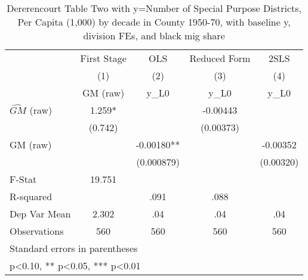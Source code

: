 \begin{table}[htbp]\centering
\def\sym#1{\ifmmode^{#1}\else\(^{#1}\)\fi}
\caption{Dererencourt Table Two with y=Number of Special Purpose Districts, Per Capita (1,000) by decade in County 1950-70, with baseline y, division FEs, and black mig share}
\begin{tabular}{l*{4}{c}}
\toprule
                    & First Stage   &         OLS   &Reduced Form   &        2SLS   \\
                    &\multicolumn{1}{c}{(1)}&\multicolumn{1}{c}{(2)}&\multicolumn{1}{c}{(3)}&\multicolumn{1}{c}{(4)}\\
                    &\multicolumn{1}{c}{GM  (raw)}&\multicolumn{1}{c}{y\_L0}&\multicolumn{1}{c}{y\_L0}&\multicolumn{1}{c}{y\_L0}\\
\midrule
$\hat{GM}$ (raw)    &       1.259*  &               &    -0.00443   &               \\
                    &     (0.742)   &               &   (0.00373)   &               \\
\addlinespace
GM  (raw)           &               &    -0.00180** &               &    -0.00352   \\
                    &               &  (0.000879)   &               &   (0.00320)   \\
\midrule
F-Stat              &      19.751   &               &               &               \\
R-squared           &               &        .091   &        .088   &               \\
Dep Var Mean        &       2.302   &         .04   &         .04   &         .04   \\
Observations        &         560   &         560   &         560   &         560   \\
\bottomrule
\multicolumn{5}{l}{\footnotesize Standard errors in parentheses}\\
\multicolumn{5}{l}{\footnotesize * p<0.10, ** p<0.05, *** p<0.01}\\
\end{tabular}
\end{table}

